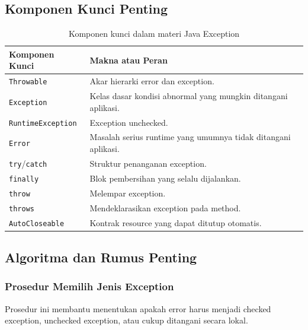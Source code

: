 \subsection{Komponen Kunci Penting}

\begin{table}[H]
\centering
\begin{tabularx}{\textwidth}{|L{0.28\textwidth}|X|}
\hline
\textbf{Komponen Kunci} & \textbf{Makna atau Peran} \\
\hline
\texttt{Throwable} & Akar hierarki error dan exception. \\
\hline
\texttt{Exception} & Kelas dasar kondisi abnormal yang mungkin ditangani aplikasi. \\
\hline
\texttt{RuntimeException} & Exception unchecked. \\
\hline
\texttt{Error} & Masalah serius runtime yang umumnya tidak ditangani aplikasi. \\
\hline
\texttt{try}/\texttt{catch} & Struktur penanganan exception. \\
\hline
\texttt{finally} & Blok pembersihan yang selalu dijalankan. \\
\hline
\texttt{throw} & Melempar exception. \\
\hline
\texttt{throws} & Mendeklarasikan exception pada method. \\
\hline
\texttt{AutoCloseable} & Kontrak resource yang dapat ditutup otomatis. \\
\hline
\end{tabularx}
\caption{Komponen kunci dalam materi Java Exception}
\label{tab:komponen-kunci-java-exception}
\end{table}

\subsection{Algoritma dan Rumus Penting}

\subsubsection{Prosedur Memilih Jenis Exception}

\begin{jawab}
Prosedur ini membantu menentukan apakah error harus menjadi checked exception, unchecked exception, atau cukup ditangani secara lokal.
\end{jawab}

